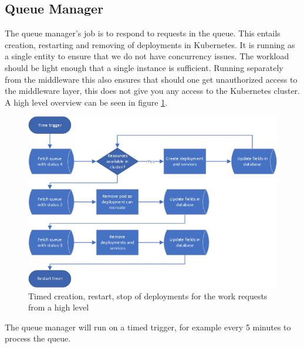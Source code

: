 \documentclass[../main.tex]{subfiles}
\begin{document}
\subsection{Queue Manager}
The queue manager's job is to respond to requests in the queue. This entails creation, restarting and removing of deployments in Kubernetes. It is running as a single entity to ensure that we do not have concurrency issues. The workload should be light enough that a single instance is sufficient. Running separately from the middleware this also ensures that should one get unauthorized access to the middleware layer, this does not give you any access to the Kubernetes cluster. A high level overview can be seen in figure \ref{fig:automation_timed_flow}.
\begin{figure}
    \centering
    \includegraphics{img/automation_timed_flow.png}
    \caption{Timed creation, restart, stop of deployments for the work requests from a high level}
    \label{fig:automation_timed_flow}
\end{figure}
The queue manager will run on a timed trigger, for example every 5 minutes to process the queue.
\end{document}
